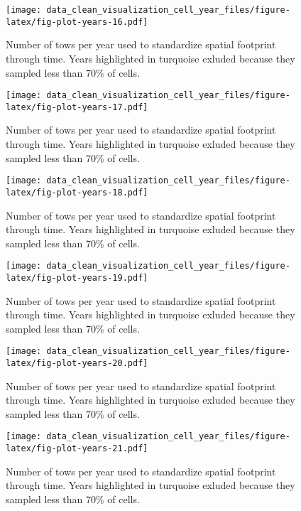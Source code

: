 \documentclass[
]{article}
\begin{document}
\begin{figure}
\centering
\texttt{[image: data\_clean\_visualization\_cell\_year\_files/figure-latex/fig-plot-years-16.pdf]}
\caption{\label{fig:fig-plot-years-16}Number of tows per year used to standardize spatial footprint through time. Years highlighted in turquoise exluded because they sampled less than 70\% of cells.}
\end{figure}

\begin{figure}
\centering
\texttt{[image: data\_clean\_visualization\_cell\_year\_files/figure-latex/fig-plot-years-17.pdf]}
\caption{\label{fig:fig-plot-years-17}Number of tows per year used to standardize spatial footprint through time. Years highlighted in turquoise exluded because they sampled less than 70\% of cells.}
\end{figure}

\begin{figure}
\centering
\texttt{[image: data\_clean\_visualization\_cell\_year\_files/figure-latex/fig-plot-years-18.pdf]}
\caption{\label{fig:fig-plot-years-18}Number of tows per year used to standardize spatial footprint through time. Years highlighted in turquoise exluded because they sampled less than 70\% of cells.}
\end{figure}

\begin{figure}
\centering
\texttt{[image: data\_clean\_visualization\_cell\_year\_files/figure-latex/fig-plot-years-19.pdf]}
\caption{\label{fig:fig-plot-years-19}Number of tows per year used to standardize spatial footprint through time. Years highlighted in turquoise exluded because they sampled less than 70\% of cells.}
\end{figure}

\begin{figure}
\centering
\texttt{[image: data\_clean\_visualization\_cell\_year\_files/figure-latex/fig-plot-years-20.pdf]}
\caption{\label{fig:fig-plot-years-20}Number of tows per year used to standardize spatial footprint through time. Years highlighted in turquoise exluded because they sampled less than 70\% of cells.}
\end{figure}

\begin{figure}
\centering
\texttt{[image: data\_clean\_visualization\_cell\_year\_files/figure-latex/fig-plot-years-21.pdf]}
\caption{\label{fig:fig-plot-years-21}Number of tows per year used to standardize spatial footprint through time. Years highlighted in turquoise exluded because they sampled less than 70\% of cells.}
\end{figure}
\end{document}
